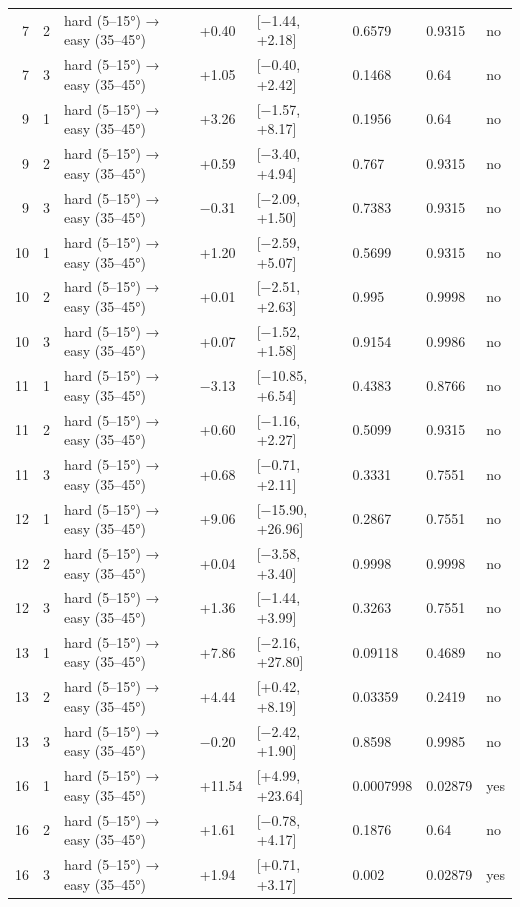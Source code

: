 \begin{table}[htbp]
\begin{tabular}{rlllllll}
    7 & 2 & hard (5–15°) → easy (35–45°) & +0.40 & [−1.44, +2.18] & 0.6579 & 0.9315 & no \\
    7 & 3 & hard (5–15°) → easy (35–45°) & +1.05 & [−0.40, +2.42] & 0.1468 & 0.64 & no \\
    9 & 1 & hard (5–15°) → easy (35–45°) & +3.26 & [−1.57, +8.17] & 0.1956 & 0.64 & no \\
    9 & 2 & hard (5–15°) → easy (35–45°) & +0.59 & [−3.40, +4.94] & 0.767 & 0.9315 & no \\
    9 & 3 & hard (5–15°) → easy (35–45°) & −0.31 & [−2.09, +1.50] & 0.7383 & 0.9315 & no \\
    10 & 1 & hard (5–15°) → easy (35–45°) & +1.20 & [−2.59, +5.07] & 0.5699 & 0.9315 & no \\
    10 & 2 & hard (5–15°) → easy (35–45°) & +0.01 & [−2.51, +2.63] & 0.995 & 0.9998 & no \\
    10 & 3 & hard (5–15°) → easy (35–45°) & +0.07 & [−1.52, +1.58] & 0.9154 & 0.9986 & no \\
    11 & 1 & hard (5–15°) → easy (35–45°) & −3.13 & [−10.85, +6.54] & 0.4383 & 0.8766 & no \\
    11 & 2 & hard (5–15°) → easy (35–45°) & +0.60 & [−1.16, +2.27] & 0.5099 & 0.9315 & no \\
    11 & 3 & hard (5–15°) → easy (35–45°) & +0.68 & [−0.71, +2.11] & 0.3331 & 0.7551 & no \\
    12 & 1 & hard (5–15°) → easy (35–45°) & +9.06 & [−15.90, +26.96] & 0.2867 & 0.7551 & no \\
    12 & 2 & hard (5–15°) → easy (35–45°) & +0.04 & [−3.58, +3.40] & 0.9998 & 0.9998 & no \\
    12 & 3 & hard (5–15°) → easy (35–45°) & +1.36 & [−1.44, +3.99] & 0.3263 & 0.7551 & no \\
    13 & 1 & hard (5–15°) → easy (35–45°) & +7.86 & [−2.16, +27.80] & 0.09118 & 0.4689 & no \\
    13 & 2 & hard (5–15°) → easy (35–45°) & +4.44 & [+0.42, +8.19] & 0.03359 & 0.2419 & no \\
    13 & 3 & hard (5–15°) → easy (35–45°) & −0.20 & [−2.42, +1.90] & 0.8598 & 0.9985 & no \\
    16 & 1 & hard (5–15°) → easy (35–45°) & +11.54 & [+4.99, +23.64] & 0.0007998 & 0.02879 & yes \\
    16 & 2 & hard (5–15°) → easy (35–45°) & +1.61 & [−0.78, +4.17] & 0.1876 & 0.64 & no \\
    16 & 3 & hard (5–15°) → easy (35–45°) & +1.94 & [+0.71, +3.17] & 0.002 & 0.02879 & yes \\
    \bottomrule
  \end{tabular}
\end{table}
